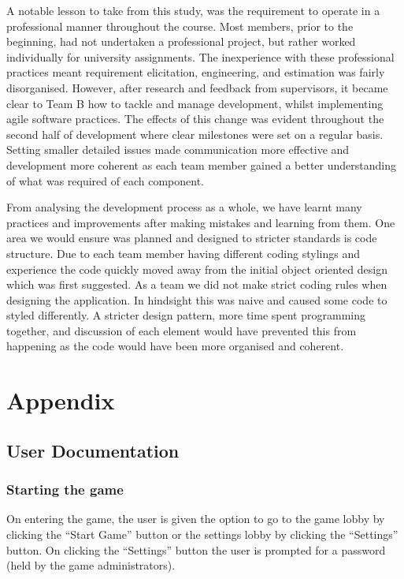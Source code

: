 \documentclass{l3proj}
\begin{document}
A notable lesson to take from this study, was the requirement to operate in a  professional manner throughout the course. Most members, prior to the beginning, had not undertaken a professional project, but rather worked individually for university assignments. The inexperience with these professional practices meant requirement elicitation, engineering, and estimation was fairly disorganised. However, after research and feedback from supervisors, it became clear to Team B how to tackle and manage development, whilst implementing agile software practices. The effects of this change was evident throughout the second half of development where clear milestones were set on a regular basis. Setting smaller detailed issues made communication more effective and development more coherent as each team member gained a better understanding of what was required of each component.

From analysing the development process as a whole, we have learnt many practices and improvements after making mistakes and learning from them. One area we would ensure was planned and designed to stricter standards is code structure. Due to each team member having different coding stylings and experience the code quickly moved away from the initial object oriented design which was first suggested. As a team we did not make strict coding rules when designing the application. In hindsight this was naive and caused some code to styled differently. A stricter design pattern, more time spent programming together, and discussion of each element would have prevented this from happening as the code would have been more organised and coherent.
\section{Appendix}
\label{sec:appendix}

\subsection{User Documentation}
\subsubsection{Starting the game}
On entering the game, the user is given the option to go to the game lobby by clicking the “Start Game” button or the settings lobby by clicking the “Settings” button. On clicking the “Settings” button the user is prompted for a password (held by the game administrators).
\end{document}
